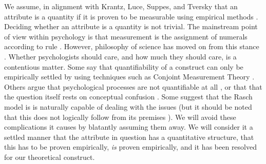 \documentclass[utf8]{FrontiersinVancouver}
\begin{document}
We assume, in alignment with Krantz, Luce, Suppes, and Tversky that an attribute is a quantity if it is proven to be measurable using empirical methods \citep{krantzFoundationsMeasurement1971}. Deciding whether an attribute is a quantity is not trivial. The mainstream point of view within psychology is that measurement is the assignment of numerals according to rule \citep{stevensMathematicsMeasurementPsychophysics1951,michellMeasurementPsychologyCritical1999}. However, philosophy of science has moved on from this stance \citep{krantzMeasurementStructuresPsychological1972}. Whether psychologists should care, and how much they should care, is a contentious matter. Some say that quantifiability of a construct can only be empirically settled by using techniques such as Conjoint Measurement Theory \citep{luceSimultaneousConjointMeasurement1964,krantzFoundationsMeasurement1971, michellMeasurementPsychologyCritical1999}. Others argue that psychological processes are not quantifiable at all \citep{trendlerConjointMeasurementUndone2019}, or that that the question itself rests on conceptual confusion \citep{franzArePsychologicalAttributes2022,tafreshiSenseNonsensePsychological2022}. Some suggest that the Rasch model is is naturally capable of dealing with the issues \citep{borsboomWhyPsychometricsNot2004} (but it should be noted that this does not logically follow from its premises \citep{woodFittingRaschModel1978, kyngdonConjointMeasurementError2008,sijtsmaPsychologicalMeasurementPhysics2012} ). We will avoid these complications it causes by blatantly assuming them away. We will consider it a settled manner that the attribute in question has a quantitative structure, that this has to be proven empirically, \textit{is} proven empirically, and it has been resolved for our theoretical construct. 
\end{document}
